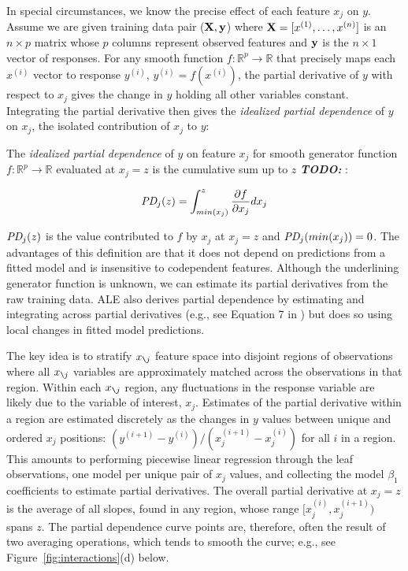 \documentclass[smallextended]{svjour3}       %
\newcommand{\figref}[1]{Figure~\ref{#1}}
\newcommand{\todo}[1]{{\bf\em TODO:} {{\color{red}{#1}}}}
\newcommand{\xnj}{$x_{\texttt{\char`\\} j}$}
\renewcommand{\xi}{x^{(i)}}
\newcommand{\yi}{y^{(i)}}
\begin{document}
In special circumstances, we know the precise effect of each feature $x_j$ on $y$.  Assume we are given training data pair ($\bf X, y$) where ${\bf X} = [x^{(1)}, \ldots, x^{(n)}]$ is an $n \times p$ matrix whose $p$ columns represent observed features and ${\bf y}$ is the $n \times 1$ vector of responses. For any smooth function $f:\mathbb{R}^{p} \rightarrow \mathbb{R}$ that precisely maps each $\xi$ vector to response $y^{(i)}$, ${y^{(i)}} = f(\xi)$, the partial derivative of $y$ with respect to $x_j$ gives the change in $y$ holding all other variables constant.  Integrating the partial derivative then gives the {\em idealized partial dependence}  of $y$ on $x_j$, the isolated contribution of $x_j$ to $y$:

 The {\em idealized partial dependence} of $y$ on feature $x_j$ for smooth generator function $f:\mathbb{R}^{p} \rightarrow \mathbb{R}$ evaluated at $x_j = z$ is the cumulative sum up to $z$ \todo{do we need to say that the partial derivative is continuous also?}:\vspace{-2mm}

\begin{equation}\label{eq:pd}
\text{\it PD}_j(z) = \int_{min(x_j)}^z \frac{\partial f}{\partial x_j} dx_j
\end{equation}\vspace{-2mm}

$\text{\it PD}_j(z)$ is the value contributed to $f$ by $x_j$ at $x_j = z$ and $\text{\it PD}_j(min(x_j))=0$. The advantages of this definition are that it does not depend on predictions from a fitted model and is insensitive to codependent features.  Although the underlining generator function is unknown, we can estimate its partial derivatives from the raw training data. ALE also derives partial dependence by estimating and integrating across partial derivatives (e.g., see Equation 7 in \cite{ALE}) but does so using local changes in fitted model predictions.


The key idea is to stratify \xnj{} feature space into disjoint regions of observations where all \xnj{} variables are approximately matched across the observations in that region. Within each \xnj{} region, any fluctuations in the response variable are likely due to the variable of interest, $x_j$.  Estimates of the partial derivative within a region are estimated discretely as the changes in $y$ values between unique and ordered $x_j$ positions:  $(y^{(i+1)} - \yi)/(x_j^{(i+1)} - x_j^{(i)})$ for all $i$ in a region.  This amounts to performing piecewise linear regression through the leaf observations, one model per unique pair of $x_j$ values, and collecting the model $\beta_1$ coefficients to estimate partial derivatives. The overall partial derivative at $x_j=z$ is the average of all slopes, found in any region, whose range $[x_j^{(i)},x_j^{(i+1)})$ spans $z$. The partial dependence curve points are, therefore, often the result of two averaging operations, which tends to smooth the curve; e.g., see \figref{fig:interactions}(d) below.
\end{document}
